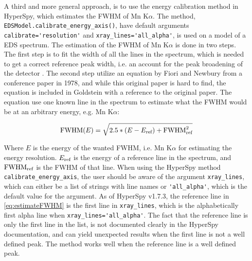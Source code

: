 A third and more general approach, is to use the energy calibration method in HyperSpy, which estimates the FWHM of Mn K$\alpha$.
The method, \verb|EDSModel.calibrate_energy_axis()|, have default arguments \verb|calibrate='resolution'| and \verb|xray_lines='all_alpha'|, is used on a model of a EDS spectrum.
The estimation of the FWHM of Mn K$\alpha$ is done in two steps.
The first step is to fit the width of all the lines in the spectrum, which is needed to get a correct reference peak width, i.e. an account for the peak broadening of the detector .
The second step utilize an equation by Fiori and Newbury from a conference paper in 1978, and while this original paper is hard to find, the equation is included in Goldstein \cite[Ch. 16.1.1]{goldstein_scanning_2018} with a reference to the original paper.
The equation use one known line in the spectrum to estimate what the FWHM would be at an arbitrary energy, e.g. Mn K$\alpha$:

\begin{equation}
    \label{eq:estimateFWHM}
    \textnormal{FWHM}(E) =  \sqrt{2.5 * (E - E_\textnormal{ref}) + \textnormal{FWHM}^2_{\textnormal{ref}}}
\end{equation}

Where $E$ is the energy of the wanted FWHM, i.e. Mn K$\alpha$ for estimating the energy resolution.
$E_\textnormal{ref}$ is the energy of a reference line in the spectrum, and $\textnormal{FWHM}_{\textnormal{ref}}$ is the FWHM of that line.
When using the HyperSpy method \verb|calibrate_energy_axis|, the user should be aware of the argument \verb|xray_lines|, which can either be a list of strings with line names or \verb|'all_alpha'|, which is the default value for the argument.
As of HyperSpy v1.7.3, the reference line in \cref{eq:estimateFWHM} is the first line in \verb|xray_lines|, which is the alphabetically first alpha line when \verb|xray_lines='all_alpha'|.
The fact that the reference line is only the first line in the list, is not documented clearly in the HyperSpy documentation, and can yield unexpected results when the first line is not a well defined peak.
The method works well when the reference line is a well defined peak. 



